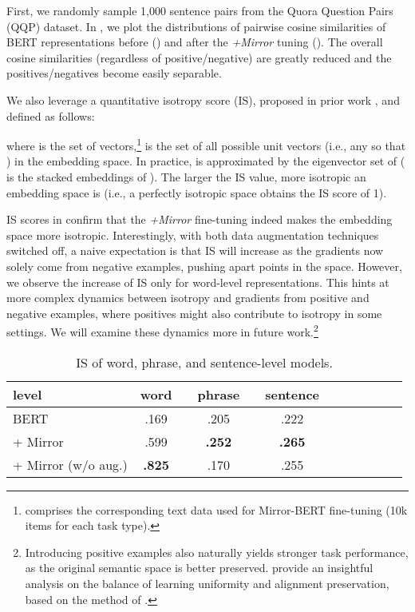 \documentclass[11pt]{article}
\begin{document}
First, we randomly sample 1,000 sentence pairs from the Quora Question Pairs (QQP) dataset. In , we plot the distributions of pairwise cosine similarities of BERT representations before () and after the \textit{+Mirror} tuning (). The overall cosine similarities (regardless of positive/negative) are greatly reduced and the positives/negatives become easily separable. 



We also leverage a quantitative isotropy score (IS), proposed in prior work \citep{arora2016latent,mu2017all}, and defined as follows:

\vspace{-1.5mm}
{\footnotesize

}where  is the set of vectors,\footnote{ comprises the corresponding text data used for Mirror-BERT fine-tuning (10k items for each task type).}  is the set of all possible unit vectors (i.e., any  so that ) in the embedding space. In practice,  is approximated by the eigenvector set of  ( is the stacked embeddings of ). The larger the IS value, more isotropic an embedding space is (i.e., a perfectly isotropic space obtains the IS score of 1). 

IS scores in  confirm that the \textit{+Mirror} fine-tuning indeed makes the embedding space more isotropic. Interestingly, with both data augmentation techniques switched off, a naive expectation is that IS will increase as the gradients now solely come from negative examples, pushing apart points in the space. However, we observe the increase of IS only for word-level representations. This hints at more complex dynamics between isotropy and gradients from positive and negative examples, where positives might also contribute to isotropy in some settings. We will examine these dynamics more in future work.\footnote{Introducing positive examples also naturally yields stronger task performance, as the original semantic space is better preserved. \citet{gao2021simcse} provide an insightful analysis on the balance of learning uniformity and alignment preservation, based on the method of \citet{wang2020understanding}.}








\begin{table}[!t]
\centering
\def\arraystretch{0.8}
\fontsize{7.9}{10}\selectfont
\begin{tabular}{lccccccccccc}
\cmidrule[1.0pt]{1-10}
level & word & & phrase & & sentence \\
\midrule
BERT  & .169 && .205 && .222 \\
+ Mirror & .599 &&  \textbf{.252} && \textbf{.265} \\
+ Mirror (w/o aug.) &  \textbf{.825} && .170 && .255  \\
\cmidrule[1.0pt]{1-10}
\end{tabular}
\vspace{-1.5mm}
\caption{IS of word, phrase, and sentence-level models.}
\label{tab:is}
\vspace{-1mm}
\end{table}
\end{document}
